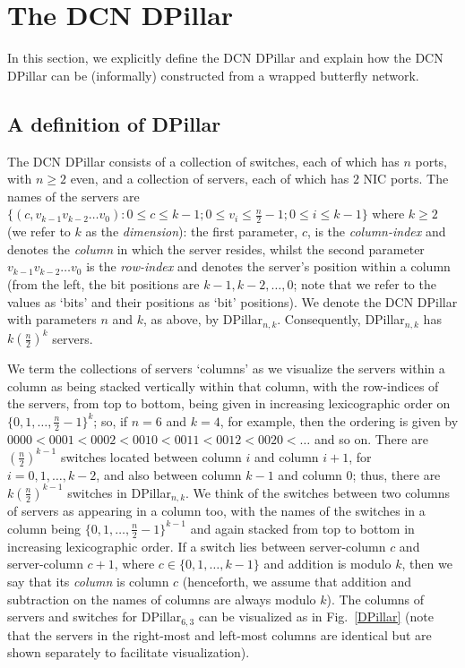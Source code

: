 \documentclass{article}
\begin{document}
\section{The DCN DPillar}\label{sec:def}

In this section, we explicitly define the DCN DPillar and explain how the DCN DPillar can be (informally) constructed from a wrapped butterfly network.

\subsection{A definition of DPillar}

The DCN DPillar \cite{LYY12} consists of a collection of switches, each of which has $n$ ports, with $n\geq 2$ even, and a collection of servers, each of which has $2$ NIC ports. The names of the servers are $\{(c,v_{k-1}v_{k-2}\ldots v_0): 0\leq c \leq k-1; 0\leq v_i \leq \frac{n}{2}-1; 0\leq i\leq k-1\}$ where $k\geq 2$ (we refer to $k$ as the \emph{dimension\/}): the first parameter, $c$, is the \emph{column-index\/} and denotes the \emph{column\/} in which the server resides, whilst the second parameter $v_{k-1}v_{k-2}\ldots v_0$ is the \emph{row-index\/} and denotes the server's position within a column (from the left, the bit positions are $k-1, k-2, \ldots,0$; note that we refer to the values as `bits' and their positions as `bit' positions). We denote the DCN DPillar with parameters $n$ and $k$, as above, by DPillar$_{n,k}$. Consequently, DPillar$_{n,k}$ has $k(\frac{n}{2})^k$ servers. 

We term the collections of servers `columns' as we visualize the servers within a column as being stacked vertically within that column, with the row-indices of the servers, from top to bottom, being given in increasing lexicographic order on $\{0,1,\ldots,\frac{n}{2}-1\}^k$; so, if $n=6$ and $k=4$, for example, then the ordering is given by $0000<0001<0002<0010<0011<0012<0020<\ldots$ and so on. There are $(\frac{n}{2})^{k-1}$ switches located between column $i$ and column $i+1$, for $i=0,1,\ldots,k-2$, and also between column $k-1$ and column $0$; thus, there are $k(\frac{n}{2})^{k-1}$ switches in DPillar$_{n,k}$. We think of the switches between two columns of servers as appearing in a column too, with the names of the switches in a column being $\{0,1,\ldots,\frac{n}{2}-1\}^{k-1}$ and again stacked from top to bottom in increasing lexicographic order. If a switch lies between server-column $c$ and server-column $c+1$, where $c\in\{0,1,\ldots,k-1\}$ and addition is modulo $k$, then we say that its \emph{column\/} is column $c$ (henceforth, we assume that addition and subtraction on the names of columns are always modulo $k$). The columns of servers and switches for DPillar$_{6,3}$ can be visualized as in Fig.~\ref{DPillar} (note that the servers in the right-most and left-most columns are identical but are shown separately to facilitate visualization).
\end{document}
